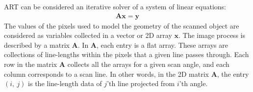 ART can be considered an iterative solver of a system of linear equations:
\begin{align}\label{grail}
    \mathbf{A}\mathbf{x}=\mathbf{y}
\end{align}
The values of the pixels used to model the geometry of the scanned object are considered as variables collected in a vector or 2D array $\mathbf{x}$. The image process is described by a matrix $\mathbf{A}$. In $\mathbf{A}$, each entry is a flat array. These arrays are collections of line-lengths within the pixels that a given line passes through. Each row in the matrix $\mathbf{A}$ collects all the arrays for a given scan angle, and each column corresponds to a scan line. In other words, in the 2D matrix $\mathbf{A}$, the entry $(i,~j)$ is the line-length data of $j$'th line  projected from $i$'th angle.\\

